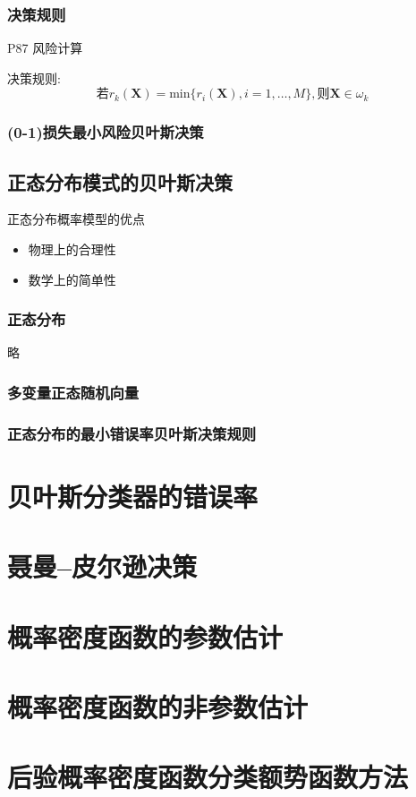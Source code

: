 \documentclass[11pt]{book}
\begin{document}
\subsubsection{决策规则}%
\label{ssub:jue_ce_gui_ze_}

P87 风险计算

决策规则:
\begin{equation}
	\mbox{若}r_k(\boldsymbol{X}) = \text{min}\{r_i(\boldsymbol{X}), i = 1, \ldots, M\}, \mbox{则}\boldsymbol{X} \in \omega_k
\end{equation}

\subsubsection{(0-1)损失最小风险贝叶斯决策}%
\label{ssub:_0_1_sun_shi_zui_xiao_feng_xian_bei_xie_si_jue_ce_}

\subsection{正态分布模式的贝叶斯决策}

正态分布概率模型的优点
\begin{itemize}
	\item 物理上的合理性
	\item 数学上的简单性
\end{itemize}

\subsubsection{正态分布}%
\label{ssub:zheng_tai_fen_bu_}

略

\subsubsection{多变量正态随机向量}%
\label{ssub:duo_bian_liang_zheng_tai_sui_ji_xiang_liang_}

\subsubsection{正态分布的最小错误率贝叶斯决策规则}%
\label{ssub:zheng_tai_fen_bu_de_zui_xiao_cuo_wu_lu_bei_xie_si_jue_ce_gui_ze_}



\section{贝叶斯分类器的错误率}

\section{聂曼--皮尔逊决策}

\section{概率密度函数的参数估计}

\section{概率密度函数的非参数估计}

\section{后验概率密度函数分类额势函数方法}
\end{document}
